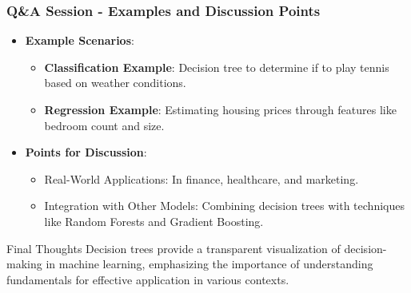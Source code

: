 \documentclass[aspectratio=169]{beamer}
\begin{document}
\begin{frame}[fragile]
    \frametitle{Q\&A Session - Examples and Discussion Points}
    \begin{itemize}
        \item \textbf{Example Scenarios}:
        \begin{itemize}
            \item \textbf{Classification Example}: Decision tree to determine if to play tennis based on weather conditions.
            \item \textbf{Regression Example}: Estimating housing prices through features like bedroom count and size.
        \end{itemize}
        
        \item \textbf{Points for Discussion}:
        \begin{itemize}
            \item Real-World Applications: In finance, healthcare, and marketing.
            \item Integration with Other Models: Combining decision trees with techniques like Random Forests and Gradient Boosting.
        \end{itemize}
    \end{itemize}
    
    \begin{block}{Final Thoughts}
        Decision trees provide a transparent visualization of decision-making in machine learning, emphasizing the importance of understanding fundamentals for effective application in various contexts.
    \end{block}
    
\end{frame}
\end{document}
